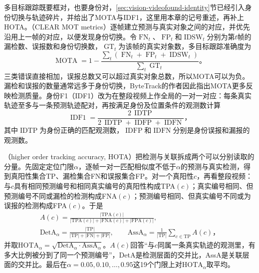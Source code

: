 多目标跟踪既要框对，也要身份对，\ref{sec:vision-videofound-identity}节已经引入身份切换与轨迹碎片，并给出了MOTA与IDF1，这里用本章的记号重述，再补上HOTA。（CLEAR MOT metrics）逐帧建立预测与真实对象之间的对应，并优先沿用上一帧的对应，以便发现身份切换。令$\operatorname{FN}_t$、$\operatorname{FP}_t$和$\operatorname{IDSW}_t$分别为第$t$帧的漏检数、误报数和身份切换数，$\operatorname{GT}_t$为该帧的真实对象数，多目标跟踪准确度为
\begin{equation}
  \operatorname{MOTA}=1-\frac{\sum_t(\operatorname{FN}_t+\operatorname{FP}_t+\operatorname{IDSW}_t)}{\sum_t \operatorname{GT}_t}\text{。}
  \label{eq:vision-video-mota}
\end{equation}
三类错误直接相加，误报总数又可以超过真实对象总数，所以MOTA可以为负。漏检和误报的数量通常远多于身份切换，ByteTrack的作者因此指出MOTA更多反映检测质量。身份F1（IDF1）改为在整段视频上作全局的一对一对应：每条真实轨迹至多与一条预测轨迹配对，再按满足身份及位置条件的观测数计算
\begin{equation}
  \operatorname{IDF1}
  =\frac{2\,\operatorname{IDTP}}
  {2\,\operatorname{IDTP}+\operatorname{IDFP}+\operatorname{IDFN}}\text{，}
  \label{eq:vision-video-idf1}
\end{equation}
其中$\operatorname{IDTP}$为身份正确的匹配观测数，$\operatorname{IDFP}$和$\operatorname{IDFN}$分别是身份误报和漏报的观测数。

（higher order tracking accuracy, HOTA）把检测与关联拆成两个可以分别读取的分量。先固定定位门限$\alpha$，逐帧一对一匹配相似度不低于$\alpha$的预测与真实检测，得到真阳性集合TP、漏检集合FN和误报集合FP。对一个真阳性$c$，再看整段视频：与$c$具有相同预测编号和相同真实编号的真阳性构成TPA$(c)$；真实编号相同、但预测编号不同或漏检的检测构成FNA$(c)$；预测编号相同、但真实编号不同或为误报的检测构成FPA$(c)$。于是
\begin{equation}
  \begin{gathered}
    A(c)=\frac{|\mathrm{TPA}(c)|}{|\mathrm{TPA}(c)|+|\mathrm{FNA}(c)|+|\mathrm{FPA}(c)|},\\
    \mathrm{DetA}_\alpha=\frac{|\mathrm{TP}|}{|\mathrm{TP}|+|\mathrm{FN}|+|\mathrm{FP}|},\qquad
    \mathrm{AssA}_\alpha=\frac{1}{|\mathrm{TP}|}\sum_{c\in\mathrm{TP}}A(c)\text{，}
  \end{gathered}
  \label{eq:vision-video-hota-parts}
\end{equation}
并取$\mathrm{HOTA}_\alpha=\sqrt{\mathrm{DetA}_\alpha\cdot\mathrm{AssA}_\alpha}$。$A(c)$回答“与$c$同属一条真实轨迹的观测里，有多大比例被分到了同一个预测编号”，DetA是检测层面的交并比，AssA是关联层面的交并比。最后在$\alpha=0.05,0.10,\ldots,0.95$这19个门限上对$\mathrm{HOTA}_\alpha$取平均。


